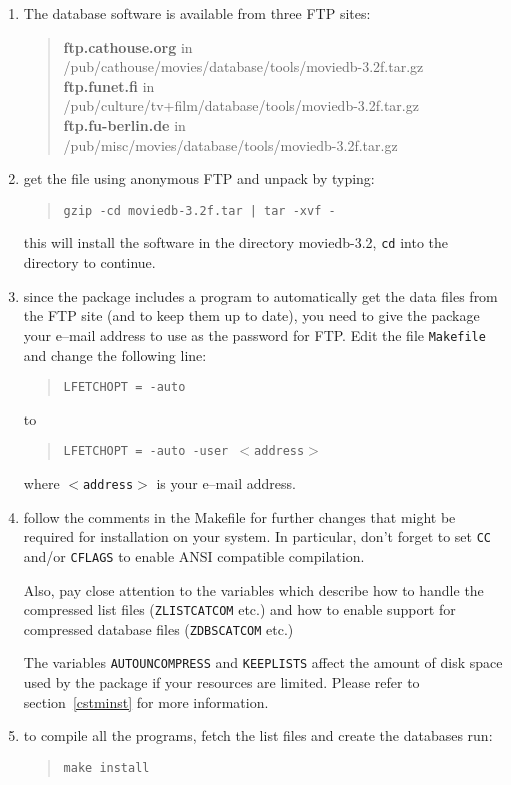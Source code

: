 \begin{enumerate}
\item The database software is available from three FTP sites:
\begin{quote}
{\bf ftp.cathouse.org} in\\
/pub/cathouse/movies/database/tools/moviedb-3.2f.tar.gz\\
{\bf ftp.funet.fi} in\\
/pub/culture/tv+film/database/tools/moviedb-3.2f.tar.gz\\
{\bf ftp.fu-berlin.de} in\\
/pub/misc/movies/database/tools/moviedb-3.2f.tar.gz
\end{quote}
\item get the file using anonymous FTP and unpack by typing:
\begin{quote}
       {\tt gzip -cd moviedb-3.2f.tar | tar -xvf -}
\end{quote}
this will install the software in the directory moviedb-3.2, {\tt cd} into
the directory to continue.
\item since the package includes a program to automatically get the data 
files
from the FTP site (and to keep them up to date), you need to give the
package your e--mail address to use as the password for FTP. Edit the
file {\tt Makefile} and change the following line:
\begin{quote}
{\tt LFETCHOPT = -auto}
\end{quote}
to
\begin{quote}
{\tt LFETCHOPT = -auto -user $<$address$>$}
\end{quote}
where {\tt $<$address$>$} is your e--mail address.
\item follow the comments in the Makefile for further changes that might be
required for installation on your system. In particular, don't forget to
set {\tt CC} and/or {\tt CFLAGS} to enable ANSI compatible compilation.

Also, pay close attention to the variables which describe how to handle
the compressed list files ({\tt ZLISTCATCOM} etc.) and how to enable 
support
for compressed database files ({\tt ZDBSCATCOM} etc.)

The variables {\tt AUTOUNCOMPRESS} and {\tt KEEPLISTS} affect the amount 
of disk space used by the package if your resources are limited. Please 
refer to section~\ref{cstminst} for more information.
\item to compile all the programs, fetch the list files and create 
the databases run:
\begin{quote}
      {\tt make install}
\end{quote}


\end{enumerate}
